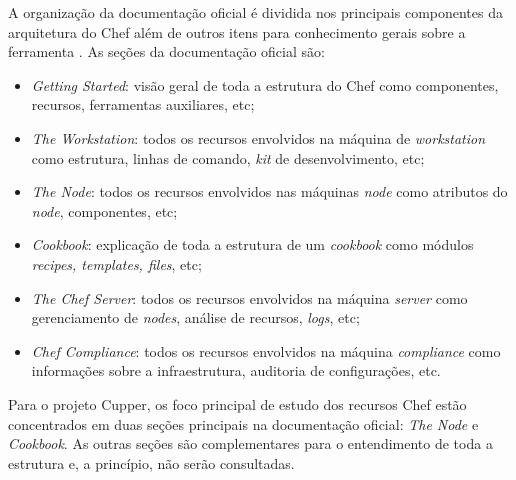 A organização da documentação oficial é dividida nos principais componentes
da arquitetura do Chef além de outros itens para conhecimento gerais sobre a
ferramenta \cite{chefdoc:2016}. As seções da documentação oficial são:

\begin{itemize}
  \item \textit{Getting Started}: visão geral de toda a estrutura do Chef
    como componentes, recursos, ferramentas auxiliares, etc;
  \item \textit{The Workstation}: todos os recursos envolvidos na máquina de \textit{workstation}
    como estrutura, linhas de comando, \textit{kit} de desenvolvimento, etc;
  \item \textit{The Node}: todos os recursos envolvidos nas máquinas \textit{node}
    como atributos do \textit{node}, componentes, etc;
  \item \textit{Cookbook}: explicação de toda a estrutura de um \textit{cookbook}
    como módulos \textit{recipes, templates, files}, etc;
  \item \textit{The Chef Server}: todos os recursos envolvidos na máquina \textit{server}
    como gerenciamento de \textit{nodes}, análise de recursos, \textit{logs}, etc;
  \item \textit{Chef Compliance}: todos os recursos envolvidos na máquina \textit{compliance}
    como informações sobre a infraestrutura, auditoria de configurações, etc.
\end{itemize}

Para o projeto Cupper, os foco principal de estudo dos recursos Chef estão
concentrados em duas seções principais na documentação oficial: \textit{The Node} e
\textit{Cookbook}. As outras seções são complementares para o entendimento de toda
a estrutura e, a princípio, não serão consultadas.

